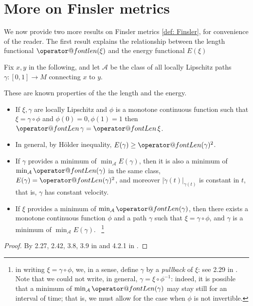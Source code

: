 \documentclass[twoside,a4paper,english]{article}
\makeatletter
\def\len{\mathop{\operator@font len}\nolimits}
\def\Len{\mathop{\operator@font Len}\nolimits}
\makeatother
\begin{document}
\appendix


\section{More on Finsler metrics} \label{app:finsler}

We now provide two more results
on Finsler metrics \ref{def: Finsler}, for convenience of the reader.
The first result explains the relationship between the
length functional $\len(\xi)$ and the energy functional $E(\xi)$
\begin{Proposition}\label{prop: len and E}
    \def\A{{\mathcal A}} Fix $x,y$ in the following, and let $\A$ be
    the class of all locally Lipschitz paths $\gamma:[0,1]\to M$
    connecting $x$ to $y$.
    
  These are known properties of the the length and the energy.
  \begin{itemize}
  \item If $\xi,\gamma$ are locally Lipschitz and $\phi$ is a monotone
    continuous function such that $\xi=\gamma \circ \phi$
    and $\phi(0)=0,\phi(1)=1$ then
    $\Len\gamma=\Len\xi$.
    
  \item 
    In general, by H\"older inequality, $E(\gamma)\ge \Len(\gamma)^2$.
    
  \item 
    If $\gamma$ provides a minimum of $\min_\A {E(\gamma)}$, then it
    is also a minimum of $\min_\A {\Len(\gamma)}$ in the same class,
    ${E(\gamma)} = \Len(\gamma)^2$, and moreover $|\dot
    \gamma(t)|_{\gamma(t)}$ is constant in $t$, that is, $\gamma$ has
    constant velocity.
    
  \item 
    If $\xi$ provides a minimum of $\min_\A {\Len(\gamma)}$, then
    there exists a monotone continuous function $\phi$ and a path
    $\gamma$ such that $\xi=\gamma \circ \phi$, and $\gamma$ is a
    minimum of $\min_\A {E(\gamma)}$.  ~\footnote{in writing
      $\xi=\gamma \circ \phi$, we, in a sense, define $\gamma$ by a
      \emph{pullback} of $\xi$: see 2.29 in \cite{ACM:Asym}.  Note
      that we could not write, in general, $\gamma=\xi \circ
      \phi^{-1}$: indeed, it is possible that a minimum of $\min_\A
      {\Len(\gamma)}$ may stay still for an interval of time; that is,
      we must allow for the case when $\phi$ is not invertible.}

\end{itemize}
  \begin{proof}
    By 2.27, 2.42, 3.8, 3.9 in \cite{ACM:Asym} and
    4.2.1 in \cite{Ambrosio-Tilli}.
  \end{proof}
\end{Proposition}
\end{document}
